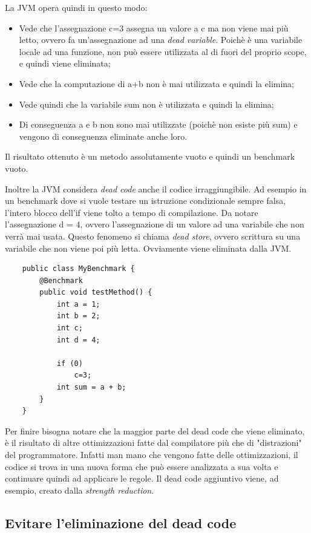 \documentclass[a4paper, 11pt,            %
openright,               %
italian,
english                 
]{article}       %
\begin{document}
	La JVM opera quindi in questo modo:
	\begin{itemize}
		\item Vede che l'assegnazione c=3 assegna un valore a c ma non viene mai più letto, ovvero fa un'assegnazione ad una \textit{dead variable}. Poichè è una variabile locale ad una funzione, non può essere utilizzata al di fuori del proprio scope, e quindi viene eliminata;
		\item Vede che la computazione di a+b non è mai utilizzata e quindi la elimina;
		\item Vede quindi che la variabile sum non è utilizzata e quindi la elimina;
		\item Di conseguenza a e b non sono mai utilizzate (poichè non esiste più sum) e vengono di conseguenza eliminate anche loro.
	\end{itemize}
	Il risultato ottenuto è un metodo assolutamente vuoto e quindi un benchmark vuoto.
	
	Inoltre la JVM considera \textit{dead code} anche il codice irraggiungibile. Ad esempio in un benchmark dove si vuole testare un istruzione condizionale sempre falsa, l'intero blocco dell'if viene tolto a tempo di compilazione.
	Da notare l'assegnazione d = 4, ovvero l'assegnazione di un valore ad una variabile che non verrà mai usata. Questo fenomeno si chiama \textit{dead store}, ovvero scrittura su una variabile che non viene poi più letta. Ovviamente viene eliminata dalla JVM.
	
	\begin{lstlisting}
	public class MyBenchmark {
		@Benchmark
		public void testMethod() {
			int a = 1;
			int b = 2;
			int c;
			int d = 4;
			
			if (0)
				c=3;
			int sum = a + b;
		}
	}
	\end{lstlisting}
	
	Per finire bisogna notare che la maggior parte del dead code che viene eliminato, è il risultato di altre ottimizzazioni fatte dal compilatore più che di "distrazioni" del programmatore. Infatti man mano che vengono fatte delle ottimizzazioni, il codice si trova in una nuova forma che può essere analizzata a sua volta e continuare quindi ad applicare le regole. Il dead code aggiuntivo viene, ad esempio, creato dalla \textit{strength reduction}.
	
	\subsection{Evitare l'eliminazione del dead code}
	
\end{document}
